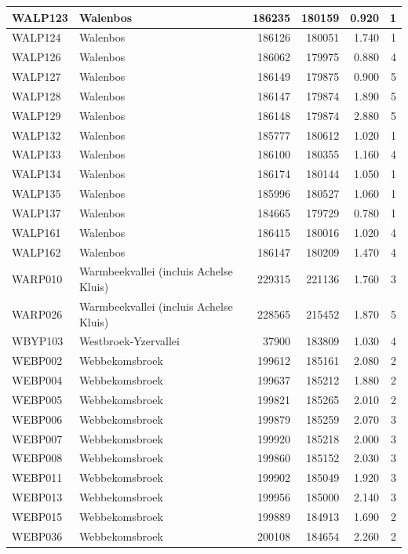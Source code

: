 \documentclass[11pt,]{book}
\begin{document}
\begin{table}
\begin{tabular}[t]{l|l|r|r|r|r}
\hline
WALP123 & Walenbos & 186235 & 180159 & 0.920 & 1\\
\hline
WALP124 & Walenbos & 186126 & 180051 & 1.740 & 1\\
\hline
WALP126 & Walenbos & 186062 & 179975 & 0.880 & 4\\
\hline
WALP127 & Walenbos & 186149 & 179875 & 0.900 & 5\\
\hline
WALP128 & Walenbos & 186147 & 179874 & 1.890 & 5\\
\hline
WALP129 & Walenbos & 186148 & 179874 & 2.880 & 5\\
\hline
WALP132 & Walenbos & 185777 & 180612 & 1.020 & 1\\
\hline
WALP133 & Walenbos & 186100 & 180355 & 1.160 & 4\\
\hline
WALP134 & Walenbos & 186174 & 180144 & 1.050 & 1\\
\hline
WALP135 & Walenbos & 185996 & 180527 & 1.060 & 1\\
\hline
WALP137 & Walenbos & 184665 & 179729 & 0.780 & 1\\
\hline
WALP161 & Walenbos & 186415 & 180016 & 1.020 & 4\\
\hline
WALP162 & Walenbos & 186147 & 180209 & 1.470 & 4\\
\hline
WARP010 & Warmbeekvallei (incluis Achelse Kluis) & 229315 & 221136 & 1.760 & 3\\
\hline
WARP026 & Warmbeekvallei (incluis Achelse Kluis) & 228565 & 215452 & 1.870 & 5\\
\hline
WBYP103 & Westbroek-Yzervallei & 37900 & 183809 & 1.030 & 4\\
\hline
WEBP002 & Webbekomsbroek & 199612 & 185161 & 2.080 & 2\\
\hline
WEBP004 & Webbekomsbroek & 199637 & 185212 & 1.880 & 2\\
\hline
WEBP005 & Webbekomsbroek & 199821 & 185265 & 2.010 & 2\\
\hline
WEBP006 & Webbekomsbroek & 199879 & 185259 & 2.070 & 3\\
\hline
WEBP007 & Webbekomsbroek & 199920 & 185218 & 2.000 & 3\\
\hline
WEBP008 & Webbekomsbroek & 199860 & 185152 & 2.030 & 3\\
\hline
WEBP011 & Webbekomsbroek & 199902 & 185049 & 1.920 & 3\\
\hline
WEBP013 & Webbekomsbroek & 199956 & 185000 & 2.140 & 3\\
\hline
WEBP015 & Webbekomsbroek & 199889 & 184913 & 1.690 & 2\\
\hline
WEBP036 & Webbekomsbroek & 200108 & 184654 & 2.260 & 2\\

\end{tabular}
\end{table}
\end{document}
